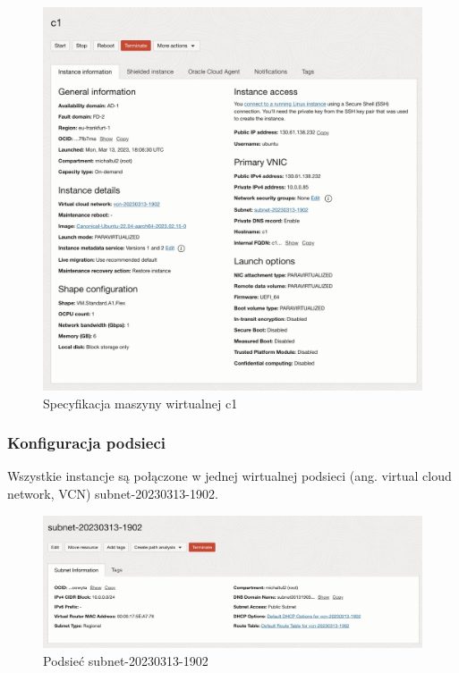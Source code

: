 \begin{figure}[H]
    \centering
    \includegraphics[width=\textwidth]{img/oci-instance-details}
    \caption{Specyfikacja maszyny wirtualnej c1}
    \label{fig:oci-instance-details}
\end{figure}

\subsubsection{Konfiguracja podsieci}

Wszystkie instancje są połączone w jednej wirtualnej podsieci (ang. virtual cloud network, VCN) subnet-20230313-1902.

\begin{figure}[H]
    \centering
    \includegraphics[width=\textwidth]{img/oci-subnet}
    \caption{Podsieć subnet-20230313-1902}
    \label{fig:oci-subnet}
\end{figure}

